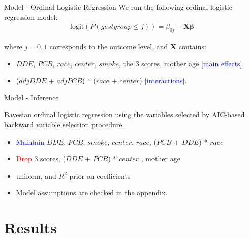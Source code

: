 \documentclass{beamer}
\begin{document}
\begin{frame}{Model - Ordinal Logistic Regression}
We run the following ordinal logistic regression model:
\begin{align*}
\textrm{logit}(P(gestgroup \leq j)) = \beta_{0j} - \mathbf{X} \boldsymbol{\beta}
\end{align*}

where $j = 0,1$ corresponds to the outcome level, and \textbf{X} contains:
\begin{itemize}
	\item $DDE$, $PCB$, $race$, $center$, $smoke$, the 3 scores, mother age [\textcolor{blue}{main effects}]
	\item ($adjDDE$ + $adjPCB$) * ($race$ + $center$) [\textcolor{blue}{interactions}].
\end{itemize}

\end{frame}


\begin{frame}{Model - Inference}

Bayesian ordinal logistic regression using the variables selected by AIC-based backward variable selection procedure.
\begin{itemize}
	\item \textcolor{blue}{Maintain} $DDE$, $PCB$, $smoke$, $center$, $race$, ($PCB$ + $DDE$) * $race$
	\item \textcolor{red}{Drop} 3 scores, ($DDE$ + $PCB$) * $center$ , mother age
	\item uniform, and $R^2$ prior on coefficients
	\item Model assumptions are checked in the appendix.
\end{itemize}


\end{frame}




\section{Results}
\end{document}
